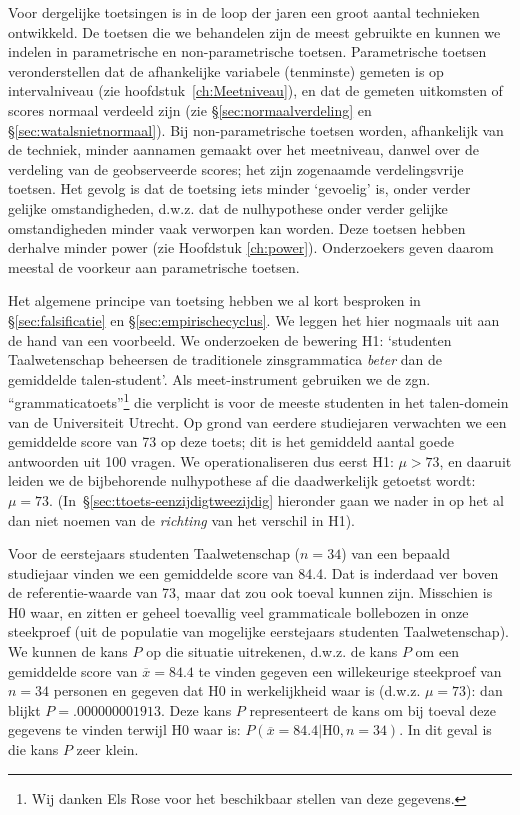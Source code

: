 \documentclass[
]{book}
\begin{document}
Voor dergelijke toetsingen is in de loop der jaren
een groot aantal technieken ontwikkeld. De toetsen die we behandelen
zijn de meest gebruikte en kunnen we indelen in parametrische en
non-parametrische toetsen. Parametrische toetsen veronderstellen dat de
afhankelijke variabele (tenminste) gemeten is op intervalniveau (zie
hoofdstuk~\ref{ch:Meetniveau}), en dat de gemeten uitkomsten of scores
normaal verdeeld zijn (zie
§\ref{sec:normaalverdeling} en
§\ref{sec:watalsnietnormaal}). Bij non-parametrische toetsen
worden, afhankelijk van de techniek, minder aannamen gemaakt over het
meetniveau, danwel over de verdeling van de geobserveerde scores; het
zijn zogenaamde verdelingsvrije toetsen. Het gevolg is dat de toetsing
iets minder `gevoelig' is, onder verder gelijke omstandigheden, d.w.z.
dat de nulhypothese onder verder gelijke omstandigheden minder vaak
verworpen kan worden. Deze toetsen hebben derhalve minder power (zie
Hoofdstuk \ref{ch:power}). Onderzoekers geven daarom meestal de voorkeur
aan parametrische toetsen.

Het algemene principe van toetsing hebben we al kort besproken in
§\ref{sec:falsificatie} en
§\ref{sec:empirischecyclus}.
We leggen het hier nogmaals uit aan
de hand van een voorbeeld. We onderzoeken de bewering H1: `studenten
Taalwetenschap beheersen de traditionele zinsgrammatica \emph{beter} dan de
gemiddelde talen-student'. Als meet-instrument gebruiken we de zgn.
``grammaticatoets''\footnote{Wij danken Els Rose voor het beschikbaar stellen van deze gegevens.} die verplicht is voor de meeste studenten in het
talen-domein van de Universiteit Utrecht. Op grond van eerdere
studiejaren verwachten we een gemiddelde score van 73 op deze toets; dit
is het gemiddeld aantal goede antwoorden uit 100 vragen. We
operationaliseren dus eerst H1: \(\mu > 73\), en daaruit leiden we de
bijbehorende nulhypothese af die daadwerkelijk getoetst wordt:
\(\mu = 73\).
(In~§\ref{sec:ttoets-eenzijdigtweezijdig} hieronder gaan we nader in
op het al dan niet noemen van de \emph{richting} van het verschil in H1).

Voor de
eerstejaars studenten Taalwetenschap (\(n=34\)) van een bepaald studiejaar
vinden we een gemiddelde score van 84.4. Dat is inderdaad ver boven de
referentie-waarde van 73, maar dat zou ook toeval kunnen zijn. Misschien
is H0 waar, en zitten er geheel toevallig veel grammaticale bollebozen
in onze steekproef (uit de populatie van mogelijke eerstejaars studenten
Taalwetenschap). We kunnen de kans \(P\) op die situatie uitrekenen,
d.w.z. de kans \(P\) om een gemiddelde score van \(\overline{x}=84.4\) te
vinden gegeven een willekeurige steekproef van \(n=34\) personen en
gegeven dat H0 in werkelijkheid waar is (d.w.z. \(\mu=73\)): dan blijkt
\(P=.000000001913\). Deze kans \(P\) representeert de kans om bij toeval
deze gegevens te vinden terwijl H0 waar is:
\(P(\overline{x}=84.4|\textrm{H0},n=34)\). In dit geval is die kans \(P\)
zeer klein.
\end{document}
